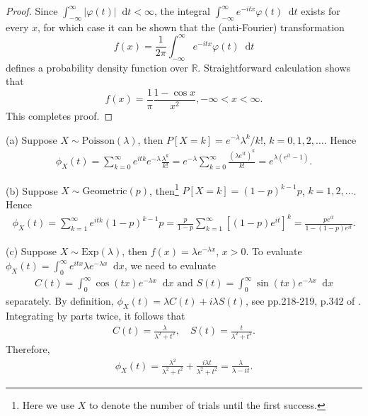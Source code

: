 \documentclass{article}
\newcommand{\real}{\mathbb{R}}
\newcommand{\dd}{\mathop{}\!\mathrm{d}}
\theoremstyle{definition}
\theoremstyle{plain}
\theoremstyle{remark}
\begin{document}
\begin{description}
\begin{comment}
In the same manner we can show that the left derivative $\varphi_-'(0) = 0$. Therefore $\varphi'(0)$ exists and $\varphi'(0) = 0 < \infty$. The proof is complete. 
\end{comment}

\item[Problem 1]
\begin{proof}
Since $\int_{-\infty}^\infty |\varphi(t)| \dd t < \infty$, the integral $\int_{-\infty}^\infty e^{-itx}\varphi(t) \dd t$ exists for every $x$, for which case it can be shown that the (anti-Fourier) transformation
\begin{equation*}
f(x) = \frac{1}{2\pi} \int_{-\infty}^\infty e^{-itx} \varphi(t) \dd t
\end{equation*}
defines a probability density function over $\real$. Straightforward calculation shows that 
$$f(x) = \frac{1}{\pi}\frac{1 - \cos x}{x^2}, -\infty < x < \infty.$$
This completes proof.
\end{proof}

\item[Problem 2]
\begin{description}
\item{(a)} Suppose $X \sim \text{Poisson}(\lambda)$, then $P[X = k] = e^{-\lambda}
\lambda^k/k!$, $k = 0, 1, 2, \ldots$. Hence
\begin{align*}
\phi_X(t) = \sum_{k = 0}^\infty e^{itk}e^{-\lambda}\frac{\lambda^k}{k!}
= e^{-\lambda}\sum_{k = 0}^\infty \frac{(\lambda e^{it})^k}{k!}
= e^{\lambda(e^{it} - 1)}.
\end{align*}

\item{(b)} Suppose $X \sim \text{Geometric}(p)$, then\footnote{Here we use $X$ to 
denote the number of trials until the first success.} $P[X = k] = (1 - p)^{k - 1}p$,
$k = 1, 2, \ldots$. Hence
\begin{align*}
\phi_X(t) = \sum_{k = 1}^\infty e^{itk}(1 - p)^{k - 1}p = 
\frac{p}{1 - p} \sum_{k = 1}^{\infty}[(1 - p)e^{it}]^k = 
\frac{pe^{it}}{1 - (1 - p)e^{it}}.
\end{align*}

\item{(c)} Suppose $X \sim \text{Exp}(\lambda)$, then $f(x) = \lambda e^{-\lambda x}$,
$x > 0$. To evaluate $\phi_X(t) = \int_0^\infty e^{itx} \lambda e^{-\lambda x} \dd x$, 
we need to evaluate 
\begin{align*}
    C(t) = \int_0^\infty \cos(tx)e^{-\lambda x} \dd x \text{ and }
    S(t) = \int_0^\infty \sin(tx)e^{-\lambda x} \dd x
\end{align*}
separately. By definition, $\phi_X(t) = \lambda C(t) + i\lambda S(t)$, see 
pp.218-219, p.342 of \cite{billingsley95}. Integrating by parts twice, it follows that
\begin{align*}
    C(t) = \frac{\lambda}{\lambda^2 + t^2}, \quad
    S(t) = \frac{t}{\lambda^2 + t^2}.
\end{align*}
Therefore, 
\begin{align*}
    \phi_X(t) = \frac{\lambda^2}{\lambda^2 + t^2} + \frac{i\lambda t}{\lambda^2 + t^2}
    = \frac{\lambda}{\lambda - it}.
\end{align*}


\end{description}
\end{description}
\end{document}
